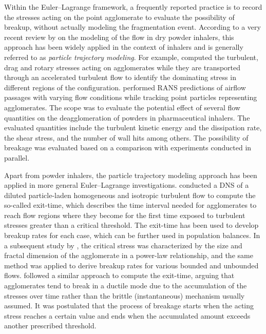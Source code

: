 %

Within the Euler--Lagrange framework, a frequently reported practice
is to record the stresses acting on the point agglomerate to evaluate
the possibility of breakup, without actually modeling the
fragmentation event. According to a very recent review by
\citet{zheng2021flow} on the modeling of the flow in dry powder
inhalers, this approach has been widely applied in the context of
inhalers and is generally referred to as \emph{particle trajectory
  modeling}.  For example,
\citet{weiler2010new,dissweiler2008generierung} computed the
turbulent, drag and rotary stresses acting on agglomerates while they
are transported through an accelerated turbulent flow to identify the
dominating stress in different regions of the
configuration. \citet{longest2013aerodynamic} performed RANS
predictions of airflow passages with varying flow conditions while
tracking point particles representing agglomerates. The scope was to
evaluate the potential effect of several flow quantities on the
deagglomeration of powders in pharmaceutical inhalers. The evaluated
quantities include the turbulent kinetic energy and the dissipation
rate, the shear stress, and the number of wall hits among others. The
possibility of breakage was evaluated based on a comparison with
experiments conducted in parallel.

Apart from powder inhalers, the particle trajectory modeling approach
has been applied in more general Euler--Lagrange investigations.
\citet{babler2012breakup} conducted a DNS of a diluted particle-laden
homogeneous and isotropic turbulent flow to compute the so-called
exit-time, which describes the time interval needed for agglomerates
to reach flow regions where they become for the first time exposed to
turbulent stresses greater than a critical threshold.  The exit-time
has been used to develop breakup rates for each case, which can be
further used in population balances. In a subsequent study by
\citet{babler2015}, the critical stress was characterized by the size
and fractal dimension of the agglomerate in a power-law relationship,
and the same method was applied to derive breakup rates for various
bounded and unbounded flows. \citet{marchioli2015turbulent} followed a
similar approach to compute the exit-time, arguing that agglomerates
tend to break in a ductile mode due to the accumulation of the
stresses over time rather than the brittle (instantaneous) mechanism
usually assumed. It was postulated that the process of breakage starts
when the acting stress reaches a certain value and ends when the
accumulated amount exceeds another prescribed threshold.

